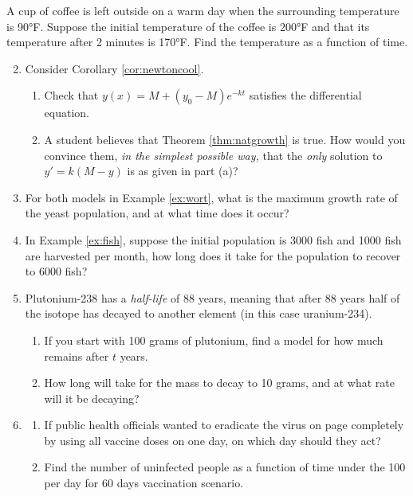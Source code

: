 \begin{exercises}
	\exstart A cup of coffee is left outside on a warm day when the surrounding temperature is \ang{90}F. Suppose the initial temperature of the coffee is \ang{200}F and that its temperature after 2 minutes is \ang{170}F. Find the temperature as a function of time.
	
	\begin{enumerate}\setcounter{enumi}{1}
	  \item Consider Corollary \ref{cor:newtoncool}.
		\begin{enumerate}
		  \item Check that $y(x)=M+(y_0-M)e^{-kt}$ satisfies the differential equation.
		  \item A student believes that Theorem \ref{thm:natgrowth} is true. How would you convince them, \emph{in the simplest possible way,} that the \emph{only} solution to $y'=k(M-y)$ is as given in part (a)?
		\end{enumerate}
		
		\item For both models in Example \ref{ex:wort}, what is the maximum growth rate of the yeast population, and at what time does it occur?
	
	
		\item In Example \ref{ex:fish}, suppose the initial population is 3000 fish and 1000 fish are harvested per month, how long does it take for the population to recover to 6000 fish?
		
		
	
	
	  \item Plutonium-238 has a \emph{half-life} of 88 years, meaning that after 88 years half of the isotope has decayed to another element (in this case uranium-234).
	  \begin{enumerate}
	  	\item If you start with 100 grams of plutonium, find a model for how much remains after $t$ years.
	  	\item How long will take for the mass to decay to 10 grams, and at what rate will it be decaying? 
	  \end{enumerate}
  
	
		\item\begin{enumerate}
		  \item If public health officials wanted to eradicate the virus on page \pageref{pg:virus} completely by using all vaccine doses on one day, on which day should they act?
		  \item Find the number of uninfected people as a function of time under the 100 per day for 60 days vaccination scenario.
		\end{enumerate}
	\end{enumerate}
\end{exercises}
